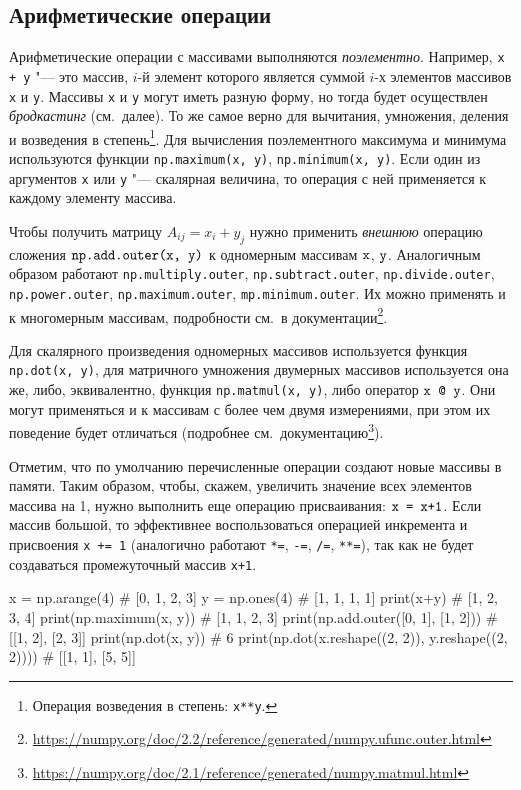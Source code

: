 \subsection{Арифметические операции}
Арифметические операции  с массивами выполняются \emph{поэлементно}.
Например, \verb"x + y" "--- это массив, $i$-й элемент которого является суммой $i$-х элементов массивов \verb"x" и \verb"y". Массивы \verb"x" и \verb"y" могут иметь разную форму, но тогда будет осуществлен \emph{бродкастинг} (см.~далее).
То же самое верно для вычитания, умножения, деления и возведения в степень\footnote{Операция возведения в степень: \verb"x**y".}.
Для вычисления поэлементного максимума и минимума используются функции \verb"np.maximum(x, y)", \verb"np.minimum(x, y)".
Если один из аргументов \verb"x" или \verb"y" "--- скалярная величина, то операция с ней применяется к каждому элементу массива.

Чтобы получить матрицу $A_{ij} = x_i+y_j$ нужно применить \emph{внешнюю} операцию сложения $\verb"np.add.outer(x, y)"$ к одномерным массивам $\verb"x"$, $\verb"y"$.
Аналогичным образом работают \verb"np.multiply.outer", \verb"np.subtract.outer", \verb"np.divide.outer", \verb"np.power.outer", \verb"np.maximum.outer", \verb"mp.minimum.outer".
Их можно применять и к многомерным массивам, подробности см.~в документации\footnote{\url{https://numpy.org/doc/2.2/reference/generated/numpy.ufunc.outer.html}}. 

Для скалярного произведения одномерных массивов используется функция \verb"np.dot(x, y)", для матричного умножения двумерных массивов используется она же, либо, эквивалентно, функция \verb"np.matmul(x, y)", либо оператор $\verb"x @ y"$.
Они могут применяться и к массивам с более чем двумя измерениями, при этом их поведение будет отличаться (подробнее см.~документацию\footnote{\url{https://numpy.org/doc/2.1/reference/generated/numpy.matmul.html}}).

Отметим, что по умолчанию перечисленные операции создают новые массивы в памяти.
Таким образом, чтобы, скажем, увеличить значение всех элементов массива на 1, нужно выполнить еще операцию присваивания: $\verb"x = x+1"$.
Если массив большой, то эффективнее воспользоваться операцией инкремента и присвоения \verb"x += 1" (аналогично работают \verb"*=", \verb"-=", \verb"/=", \verb"**="), так как не будет создаваться промежуточный массив \verb"x+1".
\begin{python}
x = np.arange(4)                                     # [0, 1, 2, 3]
y = np.ones(4)                                       # [1, 1, 1, 1]
print(x+y)                                           # [1, 2, 3, 4]
print(np.maximum(x, y))                              # [1, 1, 2, 3]
print(np.add.outer([0, 1], [1, 2]))                  # [[1, 2], [2, 3]]
print(np.dot(x, y))                                  # 6
print(np.dot(x.reshape((2, 2)), y.reshape((2, 2))))  # [[1, 1], [5, 5]]
\end{python}


